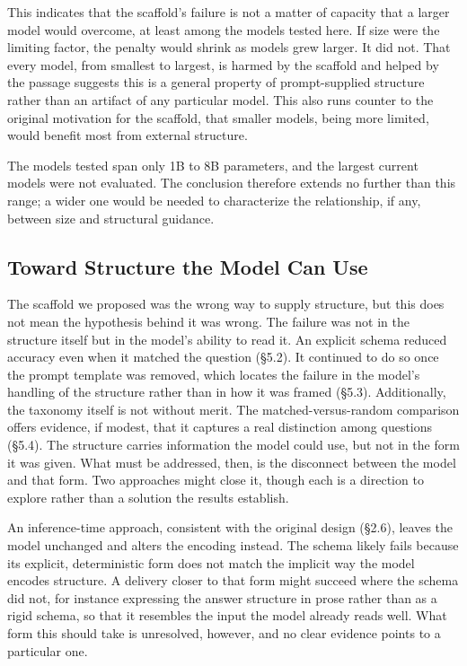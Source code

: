 \documentclass{article}
\begin{document}
This indicates that the scaffold's failure is not a matter of capacity that a larger model would overcome, at least among the models tested here. If size were the limiting factor, the penalty would shrink as models grew larger. It did not. That every model, from smallest to largest, is harmed by the scaffold and helped by the passage suggests this is a general property of prompt-supplied structure rather than an artifact of any particular model. This also runs counter to the original motivation for the scaffold, that smaller models, being more limited, would benefit most from external structure.

The models tested span only 1B to 8B parameters, and the largest current models were not evaluated. The conclusion therefore extends no further than this range; a wider one would be needed to characterize the relationship, if any, between size and structural guidance.

\subsection{Toward Structure the Model Can Use}

The scaffold we proposed was the wrong way to supply structure, but this does not mean the hypothesis behind it was wrong. The failure was not in the structure itself but in the model's ability to read it. An explicit schema reduced accuracy even when it matched the question (\S5.2). It continued to do so once the prompt template was removed, which locates the failure in the model's handling of the structure rather than in how it was framed (\S5.3). Additionally, the taxonomy itself is not without merit. The matched-versus-random comparison offers evidence, if modest, that it captures a real distinction among questions (\S5.4). The structure carries information the model could use, but not in the form it was given. What must be addressed, then, is the disconnect between the model and that form. Two approaches might close it, though each is a direction to explore rather than a solution the results establish.

An inference-time approach, consistent with the original design (\S2.6), leaves the model unchanged and alters the encoding instead. The schema likely fails because its explicit, deterministic form does not match the implicit way the model encodes structure. A delivery closer to that form might succeed where the schema did not, for instance expressing the answer structure in prose rather than as a rigid schema, so that it resembles the input the model already reads well. What form this should take is unresolved, however, and no clear evidence points to a particular one.
\end{document}
